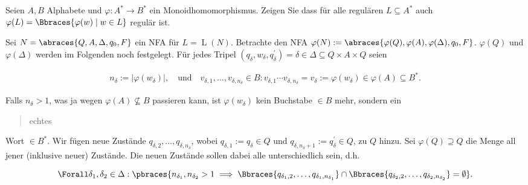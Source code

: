 
\begin{exercise}

Seien $A, B$ Alphabete und $\varphi: A^\ast \to B^\ast$ ein Monoidhomomorphismus.
Zeigen Sie dass für alle regulären $L \subseteq A^\ast$ auch $\varphi(L) = \Bbraces{\varphi(w) \mid w \in L}$ regulär ist.

\end{exercise}


\begin{solution}

Sei $N = \abraces{Q, A, \Delta, q_0, F}$ ein NFA für $L = \operatorname L(N)$.
Betrachte den NFA $\varphi(N) := \abraces{\varphi(Q), \varphi(A), \varphi(\Delta), q_0, F}$.
$\varphi(Q)$ und $\varphi(\Delta)$ werden im Folgenden noch festgelegt.
Für jedes Tripel $(q_\delta, w_\delta, q_\delta^\prime) = \delta \in \Delta \subseteq Q \times A \times Q$ seien

\begin{align*}
    n_\delta := |\varphi(w_\delta)|,
    \quad
    \text{und}
    \quad
    v_{\delta, 1}, \dots, v_{\delta, n_\delta} \in B:
        v_{\delta, 1} \cdots v_{\delta, n_\delta}
        =
        v_\delta
        :=
        \varphi(w_\delta)
        \in
        \varphi(A) \subseteq B^\ast.
\end{align*}

Falls $n_\delta > 1$, was ja wegen $\varphi(A) \not \subseteq B$ passieren kann, ist $\varphi(w_\delta)$ kein Buchstabe $\in B$ mehr, sondern ein \blockquote{echtes} Wort $\in B^\ast$.
Wir fügen neue Zustände $q_{\delta, 2}, \dots, q_{\delta, n_{\delta}}$, wobei $q_{\delta, 1} := q_\delta \in Q$ und $q_{\delta, n_\delta + 1} := q_\delta^\prime \in Q$, zu $Q$ hinzu.
Sei $\varphi(Q) \supseteq Q$ die Menge all jener (inklusive neuer) Zustände.
Die neuen Zustände sollen dabei alle unterschiedlich sein, d.h.

\begin{align*}
    \Forall \delta_1, \delta_2 \in \Delta:
        \pbraces
        {
            n_{\delta_1}, n_{\delta_2} > 1
            \implies
            \Bbraces{q_{\delta_1, 2}, \dots, q_{\delta_1, n_{\delta_1}}}
            \cap
            \Bbraces{q_{\delta_2, 2}, \dots, q_{\delta_2, n_{\delta_2}}}
            =
            \emptyset
        }.
\end{align*}


\end{solution}

